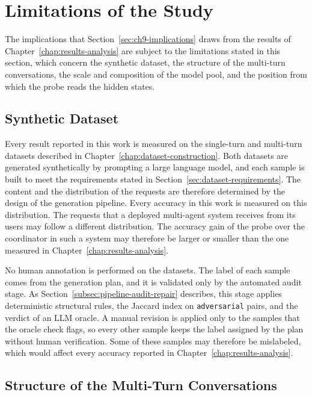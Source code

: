 \section{Limitations of the Study}
\label{sec:ch9-limitations-work}

The implications that Section~\ref{sec:ch9-implications} draws from the results of Chapter~\ref{chap:results-analysis} are subject to the limitations stated in this section, which concern the synthetic dataset, the structure of the multi-turn conversations, the scale and composition of the model pool, and the position from which the probe reads the hidden states.

\subsection{Synthetic Dataset}
\label{subsec:ch9-limitations-dataset}

Every result reported in this work is measured on the single-turn and multi-turn datasets described in Chapter~\ref{chap:dataset-construction}. Both datasets are generated synthetically by prompting a large language model, and each sample is built to meet the requirements stated in Section~\ref{sec:dataset-requirements}. The content and the distribution of the requests are therefore determined by the design of the generation pipeline. Every accuracy in this work is measured on this distribution. The requests that a deployed multi-agent system receives from its users may follow a different distribution. The accuracy gain of the probe over the coordinator in such a system may therefore be larger or smaller than the one measured in Chapter~\ref{chap:results-analysis}.

No human annotation is performed on the datasets. The label of each sample comes from the generation plan, and it is validated only by the automated audit stage. As Section~\ref{subsec:pipeline-audit-repair} describes, this stage applies deterministic structural rules, the Jaccard index on \texttt{adversarial} pairs, and the verdict of an LLM oracle. A manual revision is applied only to the samples that the oracle check flags, so every other sample keeps the label assigned by the plan without human verification. Some of these samples may therefore be mislabeled, which would affect every accuracy reported in Chapter~\ref{chap:results-analysis}.

\subsection{Structure of the Multi-Turn Conversations}
\label{subsec:ch9-limitations-multiturn}

